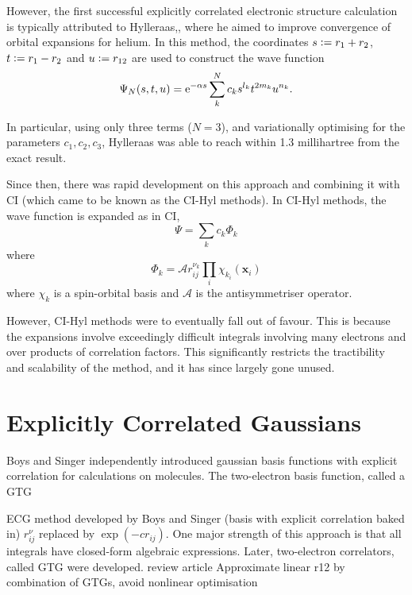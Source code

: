 However, the first successful explicitly correlated electronic structure calculation is typically attributed to Hylleraas,\cite{hattigExplicitly2012}, where he aimed to improve convergence of orbital expansions for helium.\cite{hylleraasUeber1928,hylleraasNeueBerechnungEnergie1929} In this method, the coordinates $s\mathrel{\mathop:}= r_1+r_2$, $t\mathrel{\mathop:}= r_1 - r_2$ and $u\mathrel{\mathop:}= r_{12}$ are used to construct the wave function
\begin{equation}
    \Psi_N(s,t,u) = \mathrm{e}^{-\alpha s}\sum_{k}^N c_ks^{l_k}t^{2m_k}u^{n_k}.
\end{equation}

In particular, using only three terms ($N=3$), and variationally optimising for the parameters $c_1,c_2,c_3$, Hylleraas was able to reach within 1.3 millihartree from the exact result.

Since then, there was rapid development on this approach and combining it with \gls{CI} (which came to be known as the CI-Hyl methods).
\cite{largo-cabrerizoHylleraasCI1987,jamesGround1933,kolosAccurate1964,perkinsAtomic1968,perkinsAtomic1969,simsCombined1971,simsOneCenter1971,claryHylleraastype1977,claryCIHylleraas1976} In CI-Hyl methods, the wave function is expanded as in \gls{CI},
\begin{equation}
    \Psi = \sum_k c_k \Phi_k
\end{equation}
where
\begin{equation}
    \Phi_k = \mathcal{A} r^{\nu_k}_{ij}\prod_i\chi_{k_i}(\bm x_i)
\end{equation}
where ${\chi_k}$ is a spin-orbital basis and $\mathcal{A}$ is the antisymmetriser operator.

However, CI-Hyl methods were to eventually fall out of favour. This is because the expansions involve exceedingly difficult integrals involving many electrons and over products of correlation factors. This significantly restricts the tractibility and scalability of the method, and it has since largely gone unused.

\section{Explicitly Correlated Gaussians}

Boys\cite{boysIntegral1960} and Singer\cite{singerUse1960} independently introduced gaussian basis functions with explicit correlation for calculations on molecules. The two-electron basis function, called a \gls{GTG}

\todo{}
\gls{ECG} method developed by Boys and Singer\cite{boysIntegral1960,singerUse1960} (basis with explicit correlation baked in) $r_{ij}^\nu$ replaced by $\exp(-cr_{ij})$.
One major strength of this approach is that all integrals have closed-form algebraic expressions.\cite{lesterGaussian1964} Later, two-electron correlators, called \gls{GTG} were developed. review article \cite{mitroyTheory2013} Approximate linear r12 by combination of GTGs, avoid nonlinear optimisation \cite{bukowskiNew1994,perssonAccurate1996}

